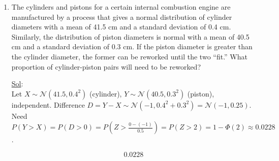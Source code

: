 \begin{enumerate}
	\item[36.] The cylinders and pistons for a certain internal combustion engine are manufactured by a process that gives a normal distribution of cylinder diameters with a mean of 41.5 cm and a standard deviation of 0.4 cm. Similarly, the distribution of piston diameters is normal with a mean of 40.5 cm and a standard deviation of 0.3 cm. If the piston diameter is greater than the cylinder diameter, the former can be reworked until the two “fit.” What proportion of cylinder-piston pairs will need to be reworked?

	      \underline{Sol}: \\

	      Let \(X \sim \mathcal{N}(41.5, 0.4^2)\) (cylinder), \(Y \sim \mathcal{N}(40.5, 0.3^2)\) (piston), independent.
	      Difference \(D = Y - X \sim \mathcal{N}(-1, 0.4^2+0.3^2) = \mathcal{N}(-1, 0.25)\).
	      Need \(P(Y > X) = P(D > 0) = P\left(Z > \frac{0 - (-1)}{0.5}\right) = P(Z > 2) = 1 - \Phi(2) \approx 0.0228\).

	      \[
		      \boxed{0.0228}
	      \]
\end{enumerate}
